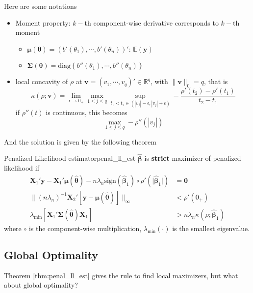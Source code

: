 \documentclass[twoside]{article}
\begin{document}
Here are some notations
\begin{itemize}
    \item Moment property: $k-$th component-wise derivative corresponds to $k-$th moment
    \begin{itemize}
        \item $\boldsymbol{\mu}(\boldsymbol{\theta}) = (b'(\theta_1),\cdots,b'(\theta_n))'$: $\mathbb{E}(\mathbf{y})$
        \item $\boldsymbol{\Sigma}(\boldsymbol{\theta}) = \mathrm{diag}\left\{ b''(\theta_1),\cdots,b''(\theta_n) \right\} $
    \end{itemize}
    \item local concavity of $\rho$ at $\mathbf{v}=(v_1,\cdots,v_q)'\in\mathbb{R}^q$, with $\lVert \mathbf{v} \rVert _0 = q$, that is 
    $$ 
    \kappa(\rho;\mathbf{v}) = \lim_{\epsilon\rightarrow 0_+} \max_{1\leq j\leq q} \sup_{t_1<t_2\in (|v_j|-\epsilon,|v_j|+\epsilon)} - \frac{\rho'(t_2)-\rho'(t_1)}{t_2-t_1}
    $$
    if $\rho''(t)$ is continuous, this becomes
    $$
    \max_{1\leq j\leq q} -\rho''(|v_j|)
    $$
\end{itemize}
And the solution is given by the following theorem 
\begin{theorem}{Penalized Likelihood estimator}{penal_ll_est}
    $\hat{\boldsymbol{\beta}}$ is \textbf{strict } maximizer of penalized likelihood if
    \begin{align*}
        \mathbf{X}_1'\mathbf{y} - \mathbf{X}_1'\boldsymbol{\mu}(\boldsymbol{\hat{\theta}})-n\lambda_n \mathrm{sign}(\hat{\boldsymbol{\beta}}_1)\circ \rho'(\lvert \hat{\boldsymbol{\beta}}_1 \rvert) &= \mathbf{0} \\
        \lVert (n\lambda_n)^{-1}\mathbf{X}_2'[\mathbf{y}-\boldsymbol{\mu}(\hat{\boldsymbol{\theta}})] \rVert _{\infty} &< \rho'(0_+) \\
        \lambda_{\min}\left[\mathbf{X}_1'\boldsymbol{\Sigma}(\hat{\boldsymbol{\theta}})\mathbf{X}_1\right] &> n\lambda_n \kappa(\rho;\hat{\boldsymbol{\beta}}_1)
    \end{align*}
    where $\circ$ is the component-wise multiplication, $\lambda_{\min}(\cdot)$ is the smallest eigenvalue.
\end{theorem}

\subsection{Global Optimality}
Theorem \ref{thm:penal_ll_est} gives the rule to find local maximizers, but what about global optimality?
\end{document}
